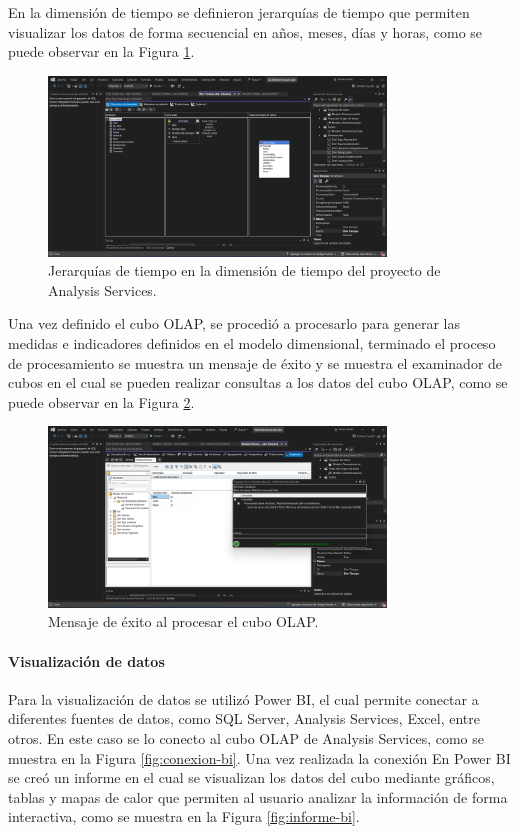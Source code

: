 En la dimensión de tiempo se definieron jerarquías de tiempo que permiten visualizar los datos de forma secuencial en años, meses,
días y horas, como se puede observar en la Figura \ref{fig:dimension-tiempo-olap}.

\begin{figure}[H]
    \centering
    \includegraphics[width=0.8\textwidth]{chapters/III-resultados-y-discusion/resources/images/dimension-tiempo-olap.png}
    \caption{Jerarquías de tiempo en la dimensión de tiempo del proyecto de Analysis Services.}
    \label{fig:dimension-tiempo-olap}
\end{figure}

Una vez definido el cubo OLAP, se procedió a procesarlo para generar las medidas e indicadores definidos en el modelo dimensional, terminado
el proceso de procesamiento se muestra un mensaje de éxito y se muestra el examinador de cubos en el cual se pueden realizar consultas a los
datos del cubo OLAP, como se puede observar en la Figura \ref{fig:exito-olap}.

\begin{figure}[H]
    \centering
    \includegraphics[width=0.8\textwidth]{chapters/III-resultados-y-discusion/resources/images/exito-olap.png}
    \caption{Mensaje de éxito al procesar el cubo OLAP.}
    \label{fig:exito-olap}
\end{figure}

\paragraph{Visualización de datos}
Para la visualización de datos se utilizó Power BI, el cual permite conectar a diferentes fuentes de datos, como SQL Server, Analysis Services,
Excel, entre otros. En este caso se lo conecto al cubo OLAP de Analysis Services, como se muestra en la Figura \ref{fig:conexion-bi}. Una vez
realizada la conexión En Power BI se creó un informe en el cual se visualizan los datos del cubo  mediante gráficos, tablas y mapas de calor
que permiten al usuario analizar la información de forma interactiva, como se muestra en la Figura \ref{fig:informe-bi}.

